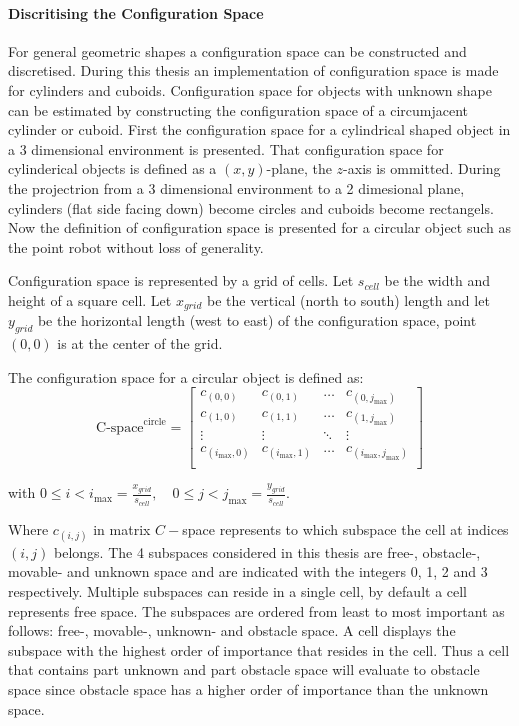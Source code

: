 \paragraph{Discritising the Configuration Space}
For general geometric shapes a configuration space can be constructed and discretised. During this thesis an implementation of configuration space is made for cylinders and cuboids. Configuration space for objects with unknown shape can be estimated by constructing the configuration space of a circumjacent cylinder or cuboid. First the configuration space for a cylindrical shaped object in a 3 dimensional environment is presented. That configuration space for cylinderical objects is defined as a $(x, y)$-plane, the $z$-axis is ommitted. During the projectrion from a 3 dimensional environment to a 2 dimesional plane, cylinders (flat side facing down) become circles and cuboids become rectangels. Now the definition of configuration space is presented for a circular object such as the point robot without loss of generality.\bs

Configuration space is represented by a grid of cells. Let $s_{\mathit{cell}}$ be the width and height of a square cell. Let $x_{\mathit{grid}}$ be the vertical (north to south) length and let $y_{\mathit{grid}}$ be the horizontal length (west to east) of the configuration space, point $(0, 0)$ is at the center of the grid.\bs

The configuration space for a circular object is defined as:\bs
\[ \textrm{C-space}^{\textrm{circle}} = 
\begin{bmatrix}
  c_{(0,0)} & c_{(0,1)} & \hdots & c_{(0,j_{\textrm{max}})}\\
  c_{(1,0)} & c_{(1,1)} & \hdots & c_{(1,j_{\textrm{max}})}\\
  \vdots &  \vdots & \ddots & \vdots\\
  c_{(i_{\textrm{max}},0)} & c_{(i_{\textrm{max}},1)} & \hdots & c_{(i_{\textrm{max}},j_{\textrm{max}})}\\
\end{bmatrix}
\]

with $0 \leq i < i_{\textrm{max}} = \frac{x_{\mathit{grid}}}{s_{\mathit{cell}}}, \quad 0 \leq j < j_{\textrm{max}} = \frac{y_{\mathit{grid}}}{s_{\mathit{cell}}}$.\bs


\cite{_unimate_2022}


Where $c_{(i,j)}$ in matrix $C-$space represents to which subspace the cell at indices $(i, j)$ belongs. The 4 subspaces considered in this thesis are free-, obstacle-, movable- and unknown space and are indicated with the integers 0, 1, 2 and 3 respectively. Multiple subspaces can reside in a single cell, by default a cell represents free space. The subspaces are ordered from least to most important as follows: free-, movable-, unknown- and obstacle space. A cell displays the subspace with the highest order of importance that resides in the cell. Thus a cell that contains part unknown and part obstacle space will evaluate to obstacle space since obstacle space has a higher order of importance than the unknown space.\bs

